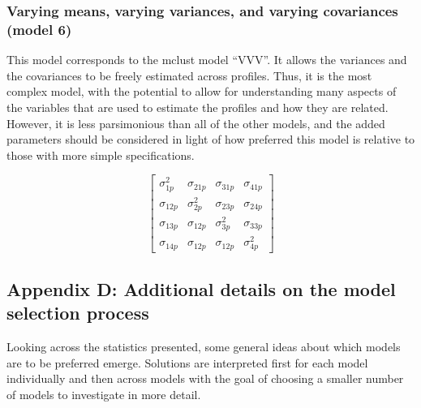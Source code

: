 \documentclass[]{book}
\theoremstyle{definition}
\theoremstyle{definition}
\theoremstyle{definition}
\theoremstyle{remark}
\begin{document}
\subsubsection{Varying means, varying variances, and varying covariances
(model
6)}\label{varying-means-varying-variances-and-varying-covariances-model-6}

This model corresponds to the mclust model ``VVV''. It allows the
variances and the covariances to be freely estimated across profiles.
Thus, it is the most complex model, with the potential to allow for
understanding many aspects of the variables that are used to estimate
the profiles and how they are related. However, it is less parsimonious
than all of the other models, and the added parameters should be
considered in light of how preferred this model is relative to those
with more simple specifications.

\[
\left[ \begin{matrix} { \sigma  }_{ 1p }^{ 2 } & { \sigma  }_{ 21p } & { \sigma  }_{ 31p } & { \sigma  }_{ 41p } \\ { \sigma  }_{ 12p } & { \sigma  }_{ 2p }^{ 2 } & { \sigma  }_{ 23p } & { \sigma  }_{ 24p } \\ { \sigma  }_{ 13p } & { \sigma  }_{ 12p } & { \sigma  }_{ 3p }^{ 2 } & { \sigma  }_{ 33p } \\ { \sigma  }_{ 14p } & { \sigma  }_{ 12p } & { \sigma  }_{ 12p } & { \sigma  }_{ 4p }^{ 2 } \end{matrix} \right] 
\]

\subsection{Appendix D: Additional details on the model selection
process}\label{appendix-d-additional-details-on-the-model-selection-process}

Looking across the statistics presented, some general ideas about which
models are to be preferred emerge. Solutions are interpreted first for
each model individually and then across models with the goal of choosing
a smaller number of models to investigate in more detail.
\end{document}
